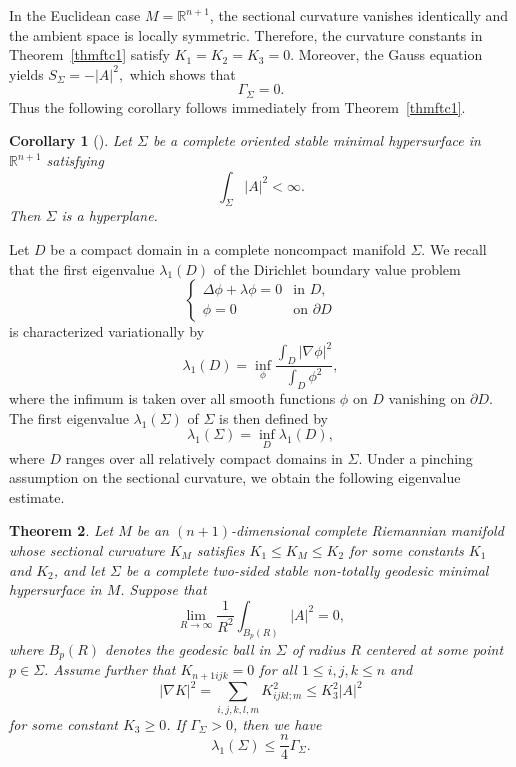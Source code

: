 \documentclass[amssymb,amstex,amsmath,11pt]{article}
\numberwithin{equation}{section}
\theoremstyle{plain}
\newtheorem{thm}{Theorem}[section]
\newtheorem{cor}[thm]{Corollary}
\theoremstyle{definition}
\theoremstyle{remark}
\begin{document}
In the Euclidean case $M=\mathbb{R}^{n+1}$, the sectional curvature vanishes identically and the ambient space is locally symmetric. Therefore, the curvature constants in Theorem~\ref{thmftc1} satisfy $K_1=K_2=K_3=0$. Moreover, the Gauss equation yields $S_\Sigma=-|A|^2,$
which shows that
$$\Gamma_\Sigma = 0.$$ Thus the following corollary follows immediately from Theorem~\ref{thmftc1}.

\begin{cor}[\cite{CP80}]\label{CP}
Let $\Sigma$ be a complete oriented stable minimal hypersurface in $\mathbb{R}^{n+1}$ satisfying
$$
\int_\Sigma |A|^2<\infty.
$$
Then $\Sigma$ is a hyperplane.
\end{cor}




\medskip


Let $D$ be a compact domain in a complete noncompact manifold $\Sigma$. We recall that the first eigenvalue $\lambda_1(D)$ of the  Dirichlet boundary value problem
$$
\begin{cases}
\Delta \phi+\lambda\phi=0 & \text{in } D,\\
\phi=0 & \text{on } \partial D
\end{cases}
$$
is characterized variationally by
$$
\lambda_1(D)=\inf_\phi \frac{\int_D |\nabla \phi|^2}{\int_D \phi^2},
$$
where the infimum is taken over all smooth functions $\phi$ on $D$ vanishing on $\partial D$. The first eigenvalue $\lambda_1(\Sigma)$ of $\Sigma$ is then defined by
\begin{equation*}
\lambda_1(\Sigma)=\inf_D \lambda_1(D),
\end{equation*}
where $D$ ranges over all relatively compact domains in $\Sigma$. Under a pinching assumption on the sectional curvature, we obtain the following eigenvalue estimate.


\begin{thm}\label{thmftc2}
Let $M$ be an $(n+1)$-dimensional complete Riemannian manifold whose sectional curvature $K_M$ satisfies $K_1\leq K_M\leq K_2$ for some constants $K_1$ and $K_2$, and let $\Sigma$ be a complete two-sided stable non-totally geodesic minimal hypersurface in $M$. Suppose that
$$
\lim_{R\to\infty}\frac{1}{R^2}\int_{B_p(R)}|A|^2=0,
$$
where $B_p(R)$ denotes the geodesic ball in $\Sigma$ of radius $R$ centered at some point $p\in\Sigma$. Assume further that $K_{n+1ijk}=0$ for all $1\leq i,j,k\leq n$ and 
$$
|\nabla K|^2=\sum_{i,j,k,l,m}K_{ijkl;m}^2\leq K_3^2|A|^2
$$
for some constant $K_3\geq 0$. If $\Gamma_{\Sigma}>0$, then we have
$$
\lambda_1(\Sigma)\leq \frac{n}{4}\Gamma_{\Sigma}.
$$
\end{thm}
\end{document}
